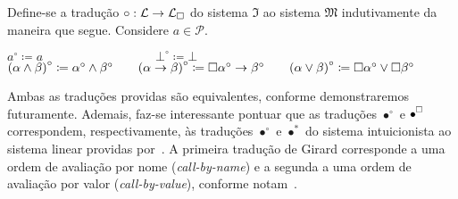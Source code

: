     \begin{tcolorbox}[enhanced jigsaw, breakable, sharp corners, colframe=black, colback=white, boxrule=0.5pt, left=1.5mm, right=1.5mm, top=1.5mm, bottom=1.5mm]
    \begin{definition}\label{translation.circle}
        Define-se a tradução $\circ:\mathcal{L}\to\mathcal{L}_{\Box}$ do sistema $\mathfrak{I}$ ao sistema $\mathfrak{M}$ indutivamente da maneira que segue.
        Considere $a\in\mathcal{P}$.

        \begin{center}
            $a^\circ\coloneqq a\quad\quad\quad\quad\quad\quad\quad\quad\quad\bot^\circ\coloneqq\bot$\\\vspace{0.5\baselineskip}
            ${(\alpha\wedge\beta)}^\circ\coloneqq\alpha^\circ\wedge\beta^\circ\quad\quad{(\alpha \to \beta)}^\circ\coloneqq \Box \alpha^\circ \to \beta^\circ\quad\quad{(\alpha\vee\beta)}^\circ\coloneqq\Box\alpha^\circ\vee\Box\beta^\circ$
        \end{center}
    \end{definition}
    \end{tcolorbox}

    \vspace{0.5\baselineskip}
    Ambas as traduções providas são equivalentes, conforme demonstraremos futuramente.
    Ademais, faz-se interessante pontuar que as traduções $\bullet^\circ$ e $\bullet^\medsquare$ correspondem, respectivamente, às traduções $\bullet^\circ$ e $\bullet^*$ do sistema intuicionista ao sistema linear providas por~\cite{Girard}. A primeira tradução de Girard corresponde a uma ordem de avaliação por nome (\textit{call-by-name}) e a segunda a uma ordem de avaliação por valor (\textit{call-by-value}), conforme notam~\cite{Maraist}.
